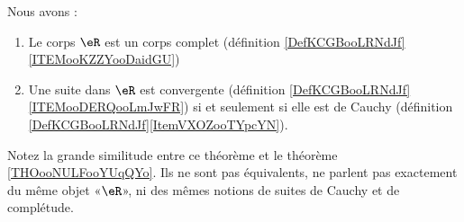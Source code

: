 \begin{theorem} \label{THOooUFVJooYJlieh}
    Nous avons :
    \begin{enumerate}
        \item
            Le corps \( \eR\) est un corps complet (définition \ref{DefKCGBooLRNdJf}\ref{ITEMooKZZYooDaidGU})
        \item
            Une suite dans \( \eR\) est convergente (définition \ref{DefKCGBooLRNdJf}\ref{ITEMooDERQooLmJwFR}) si et seulement si elle est de Cauchy (définition \ref{DefKCGBooLRNdJf}\ref{ItemVXOZooTYpcYN}).
    \end{enumerate}
\end{theorem}
Notez la grande similitude entre ce théorème et le théorème \ref{THOooNULFooYUqQYo}. Ils ne sont pas équivalents, ne parlent pas exactement du même objet «\( \eR\)», ni des mêmes notions de suites de Cauchy et de complétude.

